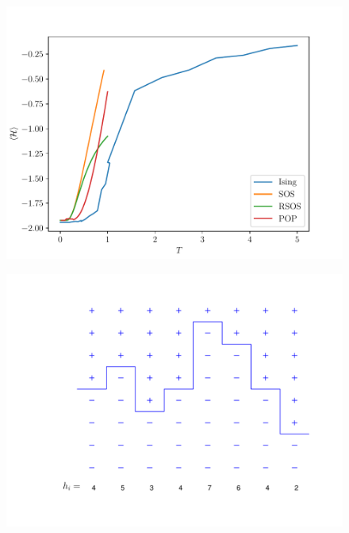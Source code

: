 \begin{figure}
    \includegraphics{pop/comparaison-modeles.pdf}
\end{figure}
\begin{figure}
    \includegraphics{pop/figure-pop.pdf}
\end{figure}